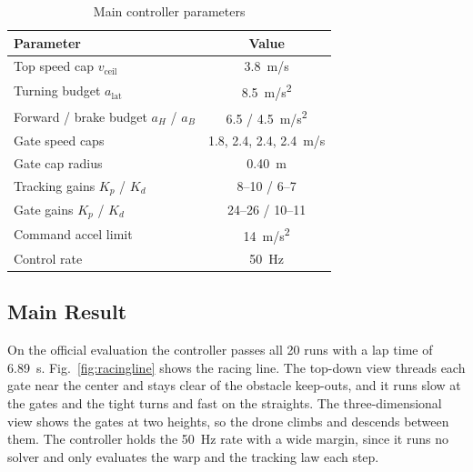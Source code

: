\documentclass[conference]{IEEEtran}
\begin{document}


\begin{table}[htbp]
\caption{Main controller parameters}
\begin{center}
\begin{tabular}{|l|c|}
\hline
\textbf{Parameter} & \textbf{Value} \\
\hline
Top speed cap $v_{\text{ceil}}$ & 3.8~m/s \\
\hline
Turning budget $a_{\text{lat}}$ & 8.5~m/s\textsuperscript{2} \\
\hline
Forward / brake budget $a_H$ / $a_B$ & 6.5 / 4.5~m/s\textsuperscript{2} \\
\hline
Gate speed caps & 1.8, 2.4, 2.4, 2.4~m/s \\
\hline
Gate cap radius & 0.40~m \\
\hline
Tracking gains $K_p$ / $K_d$ & 8--10 / 6--7 \\
\hline
Gate gains $K_p$ / $K_d$ & 24--26 / 10--11 \\
\hline
Command accel limit & 14~m/s\textsuperscript{2} \\
\hline
Control rate & 50~Hz \\
\hline
\end{tabular}
\label{tab:params}
\end{center}
\end{table}

\subsection{Main Result}
On the official evaluation the controller passes all 20 runs with a lap time of 6.89~s. Fig.~\ref{fig:racingline} shows the racing line. The top-down view threads each gate near the center and stays clear of the obstacle keep-outs, and it runs slow at the gates and the tight turns and fast on the straights. The three-dimensional view shows the gates at two heights, so the drone climbs and descends between them. The controller holds the 50~Hz rate with a wide margin, since it runs no solver and only evaluates the warp and the tracking law each step.
\end{document}
